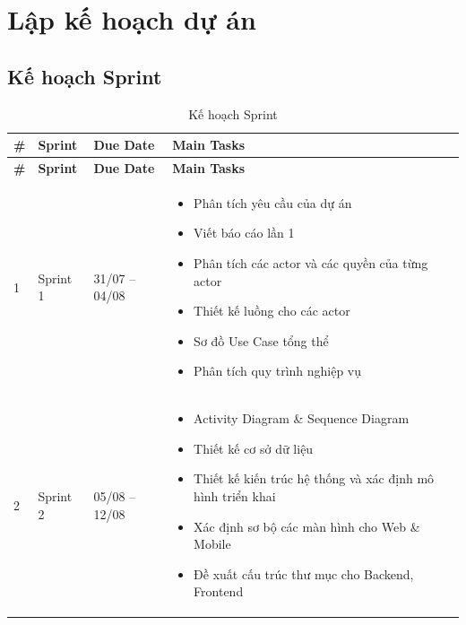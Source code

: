 \section{Lập kế hoạch dự án}


\subsection{Kế hoạch Sprint}

\begin{longtable}{|C{0.08\textwidth}|C{0.16\textwidth}|C{0.20\textwidth}|C{0.50\textwidth}|}
\caption{Kế hoạch Sprint}
\label{tab:sprint}
\\
\hline

\textbf{\#} &
\textbf{Sprint} &
\textbf{Due Date} &
\textbf{Main Tasks} \\

\hline
\endfirsthead

\hline
\textbf{\#} &
\textbf{Sprint} &
\textbf{Due Date} &
\textbf{Main Tasks} \\

\hline
\endhead

\hline
\endfoot

1 &
Sprint 1 &
31/07 -- 04/08 &
\begin{itemize}
    \item Phân tích yêu cầu của dự án
    \item Viết báo cáo lần 1
    \item Phân tích các actor và các quyền của từng actor
    \item Thiết kế luồng cho các actor
    \item Sơ đồ Use Case tổng thể
    \item Phân tích quy trình nghiệp vụ
\end{itemize}
\\
\hline

2 &
Sprint 2 &
05/08 -- 12/08 &
\begin{itemize}
    \item Activity Diagram \& Sequence Diagram
    \item Thiết kế cơ sở dữ liệu
    \item Thiết kế kiến trúc hệ thống và xác định mô hình triển khai
    \item Xác định sơ bộ các màn hình cho Web \& Mobile
    \item Đề xuất cấu trúc thư mục cho Backend, Frontend
\end{itemize}
\\
\hline


\end{longtable}
